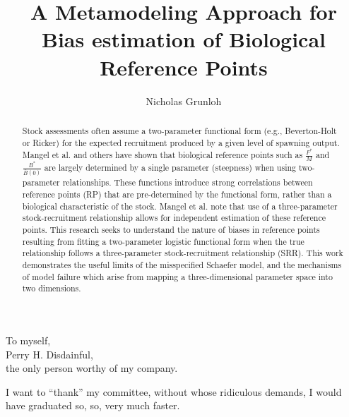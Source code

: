 \documentclass[11pt]{ucscthesis}
\title{A Metamodeling Approach for Bias estimation of Biological Reference Points}
\author{Nicholas Grunloh}
\begin{document}
%
\begin{frontmatter}

%
\maketitle
\copyrightpage
%
\tableofcontents
\listoffigures

%
\begin{abstract}
Stock assessments often assume a two-parameter functional form
(e.g., Beverton-Holt or Ricker) for the expected recruitment produced by a
given level of spawning output. Mangel et al. \cite{mangel_perspective_2013} %
and others have shown that biological reference points such as $\frac{F^*}{M}$
and $\frac{B^*}{\bar{B}(0)}$ are largely determined by a single parameter
(steepness) when using two-parameter relationships. These functions introduce
strong correlations between reference points (RP) that are pre-determined by
the functional form, rather than a biological characteristic of the stock.
Mangel et al. note that use of a three-parameter stock-recruitment
relationship allows for independent estimation of these reference points. This
research seeks to understand the nature of biases in reference points
resulting from fitting a two-parameter logistic functional form when the true
relationship follows a three-parameter stock-recruitment relationship (SRR). This  %
work demonstrates the useful limits of the misspecified Schaefer model, and
the mechanisms of model failure which arise from mapping a three-dimensional
parameter space into two dimensions.
\end{abstract}

%
\begin{dedication}
\null\vfil
{\large \color{red}
\begin{center}
To myself,\\\vspace{12pt}
Perry H. Disdainful,\\\vspace{12pt}
the only person worthy of my company.
\end{center}}
\vfil\null
\end{dedication}

%
\begin{acknowledgements}
\color{red}
I want to ``thank'' my committee, without whose ridiculous demands, I
would have graduated so, so, very much faster.
\end{acknowledgements}

\end{frontmatter}
\end{document}
